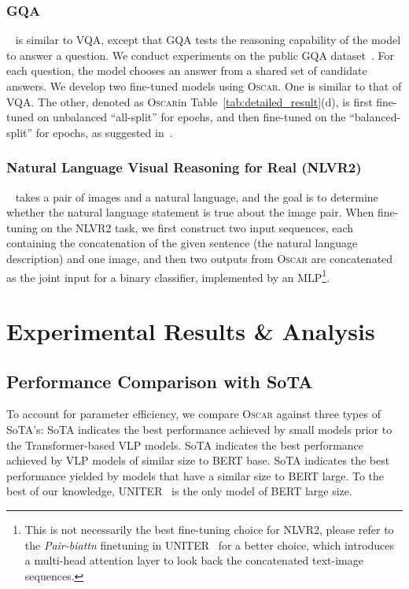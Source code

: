 \documentclass[runningheads]{llncs}
\newcommand{\short}{\textsc{Oscar}}
\def\secvspace{{\vspace{-4mm}}}
\begin{document}
\secvspace
\subsubsection{GQA}~\cite{hudson2019gqa} is similar to VQA, except that GQA tests the reasoning capability of the model to answer a question. We conduct experiments on the public GQA dataset~\cite{hudson2019gqa}. For each question, the model chooses an answer from a shared set of  candidate answers. We develop two fine-tuned models using \short. One is similar to that of VQA. The other, denoted as \short in Table~\ref{tab:detailed_result}(d), is first fine-tuned on unbalanced ``all-split'' for  epochs, 
and then fine-tuned on the ``balanced-split'' for  epochs, as suggested in~\cite{chen2019meta}.










\secvspace
\subsubsection{Natural Language Visual Reasoning for Real (NLVR2)}
\label{sec:NLVR2}~\cite{suhr2018corpus} takes a pair of images and a natural language, and the goal is to determine whether the natural language statement is true about the image pair. 
When fine-tuning on the NLVR2 task, we first construct two input sequences, each containing the concatenation of the given sentence (the natural language description) and one image, and then two  outputs from \short{} are concatenated as the joint input for a binary classifier, implemented by an MLP\footnote{This is not necessarily  the best fine-tuning choice for NLVR2, please refer to the \textit{Pair-biattn} finetuning in UNITER~\cite{chen2019uniter} for a better choice, which introduces a multi-head attention layer to look back the concatenated text-image sequences.}.










%
 \section{Experimental Results \& Analysis}
\vspace{-2mm}
\subsection{Performance Comparison with SoTA}
To account for parameter efficiency, we compare \short{} against three types of SoTA's: 
 SoTA indicates the best performance achieved by small models prior to the Transformer-based VLP models.
 SoTA indicates the best performance achieved by VLP models of similar size to BERT base. 
 SoTA indicates the best performance yielded by models that have a similar size to BERT large. To the best of our knowledge, UNITER~\cite{chen2019uniter} is the only model of BERT large size.
\end{document}
